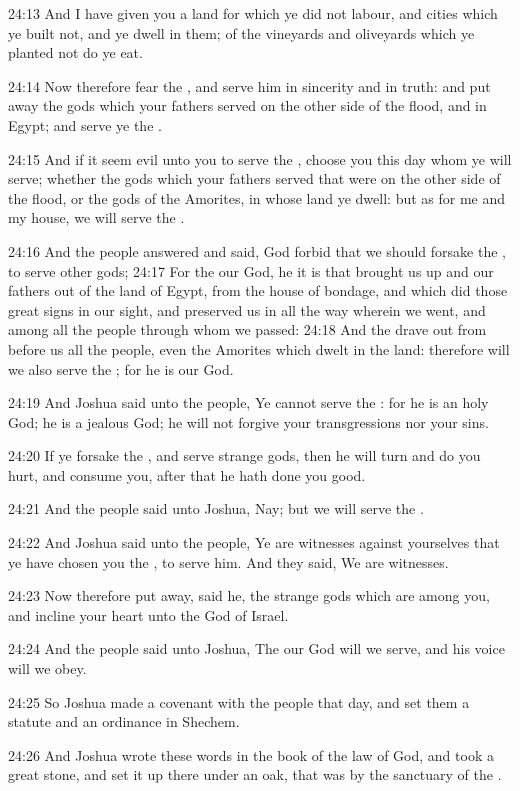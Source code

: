 24:13 And I have given you a land for which ye did not labour, and cities which ye built not, and ye dwell in them; of the vineyards and oliveyards which ye planted not do ye eat.

24:14 Now therefore fear the \LORD, and serve him in sincerity and in truth: and put away the gods which your fathers served on the other side of the flood, and in Egypt; and serve ye the \LORD.

24:15 And if it seem evil unto you to serve the \LORD, choose you this day whom ye will serve; whether the gods which your fathers served that were on the other side of the flood, or the gods of the Amorites, in whose land ye dwell: but as for me and my house, we will serve the \LORD.

24:16 And the people answered and said, God forbid that we should forsake the \LORD, to serve other gods; 24:17 For the \LORD our God, he it is that brought us up and our fathers out of the land of Egypt, from the house of bondage, and which did those great signs in our sight, and preserved us in all the way wherein we went, and among all the people through whom we passed: 24:18 And the \LORD drave out from before us all the people, even the Amorites which dwelt in the land: therefore will we also serve the \LORD; for he is our God.

24:19 And Joshua said unto the people, Ye cannot serve the \LORD: for he is an holy God; he is a jealous God; he will not forgive your transgressions nor your sins.

24:20 If ye forsake the \LORD, and serve strange gods, then he will turn and do you hurt, and consume you, after that he hath done you good.

24:21 And the people said unto Joshua, Nay; but we will serve the \LORD.

24:22 And Joshua said unto the people, Ye are witnesses against yourselves that ye have chosen you the \LORD, to serve him. And they said, We are witnesses.

24:23 Now therefore put away, said he, the strange gods which are among you, and incline your heart unto the \LORD God of Israel.

24:24 And the people said unto Joshua, The \LORD our God will we serve, and his voice will we obey.

24:25 So Joshua made a covenant with the people that day, and set them a statute and an ordinance in Shechem.

24:26 And Joshua wrote these words in the book of the law of God, and took a great stone, and set it up there under an oak, that was by the sanctuary of the \LORD.

